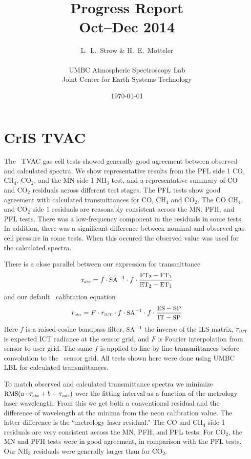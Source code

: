 \documentclass[12pt]{article}
\title{Progress Report \\
  Oct--Dec 2014}
\author{L.~L.~Strow \& H.~E.~Motteler \\
  \\
  UMBC Atmospheric Spectroscopy Lab \\
  Joint Center for Earth Systems Technology \\
}
\date{\today}
\begin{document}
\maketitle

\section{CrIS TVAC}

The \cris\ TVAC gas cell tests showed generally good agreement
between observed and calculated spectra.  We show representative
results from the PFL side 1 CO, CH$_4$, CO$_2$, and the MN side 1
NH$_3$ test, and a representative summary of CO and CO$_2$ residuals
across different test stages.  The PFL tests show good agreement
with calculated transmittances for CO, CH$_4$ and CO$_2$.  The CO
CH$_4$, and CO$_2$ side 1 residuals are reasonably consistent across
the MN, PFH, and PFL tests.  There was a low-frequency component in
the residuals in some tests.  In addition, there was a significant
difference between nominal and observed gas cell pressure in some
tests.  When this occured the observed value was used for the
calculated spectra.

There is a close parallel between our expression for
transmittance
    \[\tau_{\mbox{\tiny obs}} = f\cdot\mbox{\small SA}^{-1}\cdot f \cdot \frac{\mbox{\small FT}_2 - \mbox{\small FT}_1}{\mbox{\small ET}_2 - \mbox{\small ET}_1}\]
and our default \cris\ calibration equation
    \[r_{\mbox{\tiny obs}} = F \cdot r_{\mbox{\tiny ICT}}\cdot f \cdot
    \mbox{\small SA}^{-1}\cdot f \cdot \frac{\mbox{\small ES} - \mbox{\small SP}}{\mbox{\small IT} - \mbox{\small SP}} \]
Here $f$ is a raised-cosine bandpass filter, $\mbox{\small SA}^{-1}$ the inverse
of the ILS matrix, $r_{\mbox{\tiny ICT}}$ is expected ICT radiance
at the sensor grid, and $F$ is Fourier interpolation from sensor to
user grid.  The same $f$ is applied to line-by-line transmittances
before convolution to the \cris\ sensor grid.   All tests shown here
were done using UMBC LBL for calculated transmittances.

To match observed and calculated transmittance spectra we minimize
$\mbox{\small RMS}(a\cdot\tau_{\mbox{\tiny obs}} + b - \tau_{\mbox{\tiny calc}})$ over the fitting interval as a
function of the metrology laser wavelength.  From this we get both a
conventional residual and the difference of wavelength at the minima
from the neon calibration value.  The latter difference is the
``metrology laser residual.''  The CO and CH$_4$ side 1 residuals
are very consistent across the MN, PFH, and PFL tests.  For CO$_2$,
the MN and PFH tests were in good agreement, in comparison with the
PFL tests.  Our NH$_3$ residuals were generally larger than for
CO$_2$.
\end{document}

